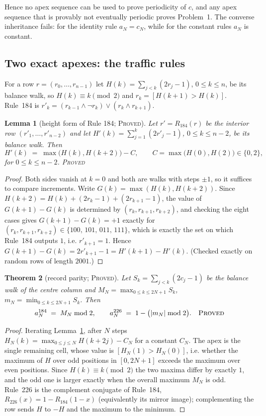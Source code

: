 \documentclass[11pt]{article}
\newtheorem{theorem}{Theorem}[section]
\newtheorem{lemma}[theorem]{Lemma}
\theoremstyle{definition}
\theoremstyle{remark}
\newcommand{\PROVED}{\textsc{Proved}}
\begin{document}
Hence no apex sequence can be used to prove periodicity of $c$, and any apex sequence that is
provably not eventually periodic proves Problem~1. The converse inheritance fails: for the identity rule
$a_N=c_N$, while for the constant rules $a_N$ is constant.

\subsection{Two exact apexes: the traffic rules}

For a row $r=(r_0,\dots,r_{n-1})$ let $H(k)=\sum_{j<k}(2r_j-1)$, $0\le k\le n$, be its balance walk, so
$H(k)\equiv k \pmod 2$ and $r_k = [H(k+1)>H(k)]$. Rule~184 is $r'_k = (r_{k-1}\wedge \neg r_k)\vee(r_k\wedge r_{k+1})$.

\begin{lemma}[height form of Rule 184; \PROVED]\label{co:lem:height}
Let $r'=R_{184}(r)$ be the interior row $(r'_1,\dots,r'_{n-2})$ and let
$H'(k)=\sum_{j=1}^{k}(2r'_j-1)$, $0\le k\le n-2$, be its balance walk. Then
\[
  H'(k) \;=\; \max\bigl(H(k),H(k+2)\bigr) - C, \qquad C=\max\bigl(H(0),H(2)\bigr)\in\{0,2\},
\]
for $0\le k\le n-2$. \PROVED
\end{lemma}
\begin{proof}
Both sides vanish at $k=0$ and both are walks with steps $\pm1$, so it suffices to compare increments.
Write $G(k)=\max(H(k),H(k+2))$. Since $H(k+2)=H(k)+(2r_k-1)+(2r_{k+1}-1)$, the value of
$G(k+1)-G(k)$ is determined by $(r_k,r_{k+1},r_{k+2})$, and checking the eight cases gives
$G(k+1)-G(k)=+1$ exactly for $(r_k,r_{k+1},r_{k+2})\in\{100,\,101,\,011,\,111\}$, which is exactly the set
on which Rule~184 outputs $1$, i.e. $r'_{k+1}=1$. Hence $G(k+1)-G(k)=2r'_{k+1}-1=H'(k+1)-H'(k)$.
(Checked exactly on random rows of length $2001$.)
\end{proof}

\begin{theorem}[record parity; \PROVED]\label{co:thm:record}
Let $S_k=\sum_{j<k}(2c_j-1)$ be the balance walk of the centre column and
$M_N=\max_{0\le k\le 2N+1}S_k$, $m_N=\min_{0\le k\le 2N+1}S_k$. Then
\[
  a^{184}_N \;=\; M_N \bmod 2, \qquad a^{226}_N \;=\; 1-\bigl(|m_N| \bmod 2\bigr). \quad\PROVED
\]
\end{theorem}
\begin{proof}
Iterating Lemma~\ref{co:lem:height}, after $N$ steps $H_N(k)=\max_{0\le j\le N}H(k+2j)-C_N$ for a constant $C_N$. The apex is the
single remaining cell, whose value is $[H_N(1)>H_N(0)]$, i.e. whether the maximum of $H$ over odd
positions in $[0,2N+1]$ exceeds the maximum over even positions. Since $H(k)\equiv k\pmod 2$ the two maxima
differ by exactly $1$, and the odd one is larger exactly when the overall maximum $M_N$ is odd.
Rule~226 is the complement conjugate of Rule~184, $R_{226}(x)=1-R_{184}(1-x)$ (equivalently its mirror image); complementing
the row sends $H$ to $-H$ and the maximum to the minimum.
\end{proof}
\end{document}
